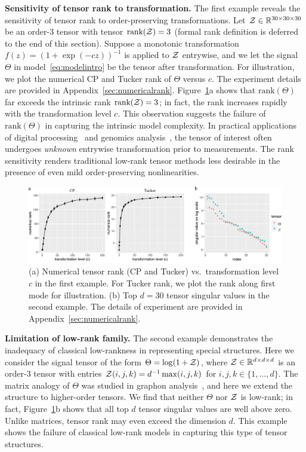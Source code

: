 \documentclass[twoside,11pt]{article}
\theoremstyle{definition}
\begin{document}
{\bf Sensitivity of tensor rank to transformation.} The first example reveals the sensitivity of tensor rank to order-preserving transformations. Let $\mathcal{Z} \in \mathbb{R}^{30\times 30\times 30}$ be an order-3 tensor with tensor $\text{rank}(\mathcal{Z})=3$ (formal rank definition is deferred to the end of this section). Suppose a monotonic transformation $f(z)=(1+\exp(-cz))^{-1}$ is applied to $\mathcal{Z}$ entrywise, and we let the signal $\Theta$ in model~\eqref{eq:modelintro} be the tensor after transformation. For illustration, we plot the numerical CP and Tucker rank of $\Theta$ versus $c$. The experiment details are provided in Appendix~\ref{sec:numericalrank}. Figure~\ref{fig:example}a shows that $\text{rank}(\Theta)$ far exceeds the intrinsic rank $\text{rank}(\mathcal{Z})=3$; in fact, the rank increases rapidly with the transformation level $c$. This observation suggests the failure of $\text{rank}(\Theta)$ in capturing the intrinsic model complexity. In practical applications of digital processing~\citep{ghadermarzy2018learning} and genomics analysis~\citep{hore2016tensor}, the tensor of interest often undergoes \emph{unknown} entrywise transformation prior to measurements. The rank sensitivity renders traditional low-rank tensor methods less desirable in the presence of even mild order-preserving nonlinearities. 


\begin{figure}[h]
\centering
\includegraphics[width=\textwidth]{figure/example_ncomb.pdf}
\caption{(a) Numerical tensor rank (CP and Tucker) vs.\ transformation level $c$ in the first example. For Tucker rank, we plot the rank along first mode for illustration. (b) Top $d=30$ tensor singular values in the second example. The details of experiment are provided in Appendix~\ref{sec:numericalrank}.}
\label{fig:example}
\end{figure}


{\bf Limitation of low-rank family.} The second example demonstrates the inadequacy of classical low-rankness in representing special structures. Here we consider the signal tensor of the form $\Theta=\log(1+\mathcal{Z})$, where $\mathcal{Z}\in\mathbb{R}^{d\times d\times d}$ is an order-3 tensor with entries $\mathcal{Z}(i,j,k)=d^{-1}\max(i,j,k)$ for $i,j,k\in\{1,\ldots,d\}$. The matrix analogy of $\Theta$ was studied in graphon analysis~\citep{chan2014consistent}, and here we extend the structure to higher-order tensors. We find that neither $\Theta$ nor $\mathcal{Z}$ is low-rank; in fact, Figure~\ref{fig:example}b
shows that all top $d$ tensor singular values are well above zero. Unlike matrices, tensor rank may even exceed the dimension $d$. This example shows the failure of classical low-rank models in capturing this type of tensor structures. 
\end{document}
